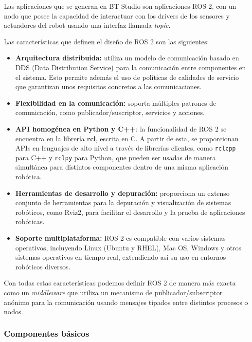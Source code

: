 Las aplicaciones que se generan en BT Studio son aplicaciones ROS 2, con un nodo que posee la capacidad de interactuar con los drivers de los sensores y actuadores del robot usando una interfaz llamada \textit{topic}. 

Las características que definen el diseño de ROS 2 son las siguientes:

\begin{itemize}
    \item \textbf{Arquitectura distribuida:} utiliza un modelo de comunicación basado en DDS (Data Distribution Service) para la comunicación entre componentes en el sistema. Esto permite además el uso de políticas de calidades de servicio que garantizan unos requisitos concretos a las comunicaciones. 

    \item \textbf{Flexibilidad en la comunicación:} soporta múltiples patrones de comunicación, como publicador/suscriptor, servicios y acciones.

    \item \textbf{API homogénea en Python y C++}: la funcionalidad de ROS 2 se encuentra en la librería \textbf{rcl}, escrita en C. A partir de esta, se proporcionan APIs en lenguajes de alto nivel a través de librerías clientes, como \texttt{rclcpp} para C++ y \texttt{rclpy} para Python, que pueden ser usadas de manera simultánea para distintos componentes dentro de una misma aplicación robótica. 

    \item \textbf{Herramientas de desarrollo y depuración:} proporciona un extenso conjunto de herramientas para la depuración y visualización de sistemas robóticos, como Rviz2, para facilitar el desarrollo y la prueba de aplicaciones robóticas.
    
    \item \textbf{Soporte multiplataforma:} ROS 2 es compatible con varios sistemas operativos, incluyendo Linux (Ubuntu y RHEL), Mac OS, Windows y otros sistemas operativos en tiempo real, extendiendo así su uso en entornos robóticos diversos.
\end{itemize}

Con todas estas características podemos definir ROS 2 de manera más exacta como un \textit{middleware} que utiliza un mecanismo de publicador/subscriptor anónimo para la comunicación usando mensajes tipados entre distintos procesos o nodos. 

\subsubsection{Componentes básicos}

